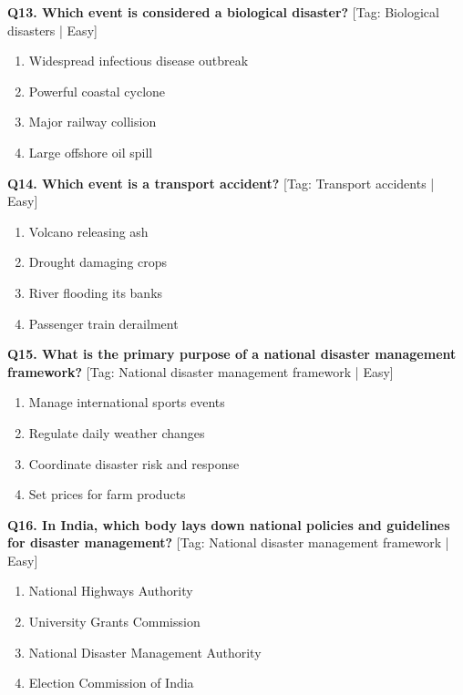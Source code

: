 \noindent\textbf{Q13. Which event is considered a biological disaster?} \hfill [Tag: Biological disasters | Easy]
\begin{enumerate}[label=(\alph*),topsep=2pt,itemsep=1pt,partopsep=0pt,parsep=0pt]
    \item {Widespread infectious disease outbreak}
    \item {Powerful coastal cyclone}
    \item {Major railway collision}
    \item {Large offshore oil spill}
\end{enumerate}
\vspace{2mm}

\noindent\textbf{Q14. Which event is a transport accident?} \hfill [Tag: Transport accidents | Easy]
\begin{enumerate}[label=(\alph*),topsep=2pt,itemsep=1pt,partopsep=0pt,parsep=0pt]
    \item {Volcano releasing ash}
    \item {Drought damaging crops}
    \item {River flooding its banks}
    \item {Passenger train derailment}
\end{enumerate}
\vspace{2mm}

\noindent\textbf{Q15. What is the primary purpose of a national disaster management framework?} \hfill [Tag: National disaster management framework | Easy]
\begin{enumerate}[label=(\alph*),topsep=2pt,itemsep=1pt,partopsep=0pt,parsep=0pt]
    \item {Manage international sports events}
    \item {Regulate daily weather changes}
    \item {Coordinate disaster risk and response}
    \item {Set prices for farm products}
\end{enumerate}
\vspace{2mm}

\noindent\textbf{Q16. In India, which body lays down national policies and guidelines for disaster management?} \hfill [Tag: National disaster management framework | Easy]
\begin{enumerate}[label=(\alph*),topsep=2pt,itemsep=1pt,partopsep=0pt,parsep=0pt]
    \item {National Highways Authority}
    \item {University Grants Commission}
    \item {National Disaster Management Authority}
    \item {Election Commission of India}
\end{enumerate}
\vspace{2mm}

